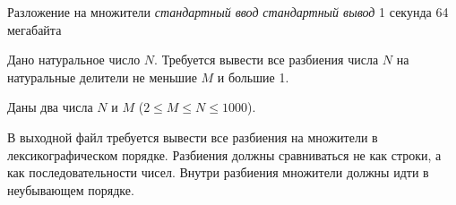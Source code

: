 \begin{problem}%
{Разложение на множители}%
{\textsl{стандартный ввод}}%
{\textsl{стандартный вывод}}%
{1 секунда}%
{64 мегабайта}{}

Дано натуральное число $N$. Требуется вывести все разбиения числа $N$ на натуральные делители не меньшие $M$ и большие 1.

\InputFile

Даны два числа $N$ и $M$ ($2 \le M \le N \le 1000$).

\OutputFile

В выходной файл требуется вывести все разбиения на множители в лексикографическом порядке. Разбиения должны сравниваться не как строки, а как последовательности чисел. Внутри разбиения множители должны идти в неубывающем порядке.

\Examples

\begin{example}
%
%
\end{example}
\end{problem}